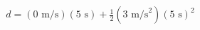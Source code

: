 \documentclass[preview]{standalone}
\begin{document}
\begin{align*}
d = (0 \text{ m/s})(5 \text{ s}) + \frac{1}{2}(3 \text{ m/s}^2)(5 \text{ s})^2
\end{align*}
\end{document}
